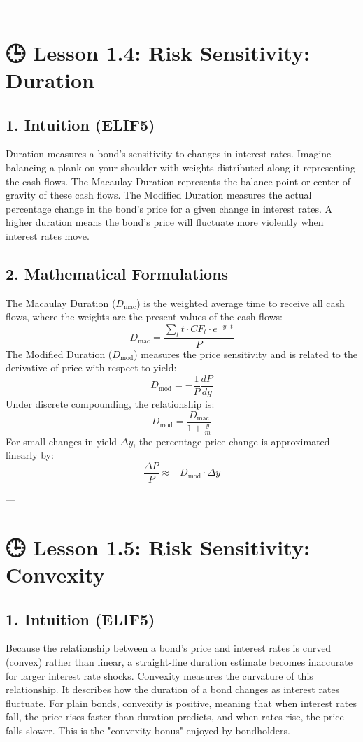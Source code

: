 \documentclass[11pt,oneside]{book}
\begin{document}
---

\section{🕒 Lesson 1.4: Risk Sensitivity: Duration}

\subsection{1. Intuition (ELIF5)}
Duration measures a bond's sensitivity to changes in interest rates. Imagine balancing a plank on your shoulder with weights distributed along it representing the cash flows. The Macaulay Duration represents the balance point or center of gravity of these cash flows. The Modified Duration measures the actual percentage change in the bond's price for a given change in interest rates. A higher duration means the bond's price will fluctuate more violently when interest rates move.

\subsection{2. Mathematical Formulations}
The Macaulay Duration ($D_{\text{mac}}$) is the weighted average time to receive all cash flows, where the weights are the present values of the cash flows:
$$D_{\text{mac}} = \frac{\sum_{t} t \cdot CF_t \cdot e^{-y \cdot t}}{P}$$
The Modified Duration ($D_{\text{mod}}$) measures the price sensitivity and is related to the derivative of price with respect to yield:
$$D_{\text{mod}} = -\frac{1}{P} \frac{dP}{dy}$$
Under discrete compounding, the relationship is:
$$D_{\text{mod}} = \frac{D_{\text{mac}}}{1 + \frac{y}{m}}$$
For small changes in yield $\Delta y$, the percentage price change is approximated linearly by:
$$\frac{\Delta P}{P} \approx -D_{\text{mod}} \cdot \Delta y$$

---

\section{🕒 Lesson 1.5: Risk Sensitivity: Convexity}

\subsection{1. Intuition (ELIF5)}
Because the relationship between a bond's price and interest rates is curved (convex) rather than linear, a straight-line duration estimate becomes inaccurate for larger interest rate shocks. Convexity measures the curvature of this relationship. It describes how the duration of a bond changes as interest rates fluctuate. For plain bonds, convexity is positive, meaning that when interest rates fall, the price rises faster than duration predicts, and when rates rise, the price falls slower. This is the "convexity bonus" enjoyed by bondholders.
\end{document}
